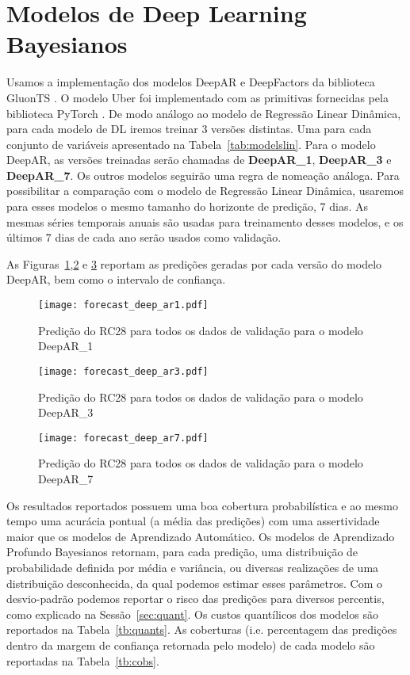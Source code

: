 \section{Modelos de Deep Learning Bayesianos}


Usamos a implementação dos modelos DeepAR e DeepFactors da biblioteca GluonTS
\citep{gluonts}. O modelo Uber foi implementado com as primitivas fornecidas
pela biblioteca PyTorch \citep{pytorch}. De modo análogo ao modelo de Regressão Linear Dinâmica, para
cada modelo de DL iremos treinar 3 versões distintas. Uma para cada conjunto de
variáveis apresentado na Tabela~\ref{tab:modelslin}. Para o modelo DeepAR, as versões treinadas serão chamadas de \textbf{DeepAR\_1},
\textbf{DeepAR\_3} e \textbf{DeepAR\_7}. Os outros modelos seguirão uma
regra de nomeação análoga. Para possibilitar a comparação com o modelo de Regressão Linear Dinâmica, usaremos para esses modelos o mesmo
tamanho do horizonte de predição, 7 dias. As mesmas séries temporais anuais são
usadas para treinamento desses modelos, e os últimos 7 dias de cada ano serão
usados como validação.

As Figuras~\ref{fig:fordeepar1},\ref{fig:fordeepar3} e \ref{fig:fordeepar7} reportam as
predições geradas por cada versão do modelo DeepAR, bem como o intervalo de confiança. 

\begin{figure}[H]
  \centering
  \texttt{[image: forecast\_deep\_ar1.pdf]} 
  \caption{Predição do RC28 para todos os dados de validação para o modelo DeepAR\_1}
  \label{fig:fordeepar1}
\end{figure}

\begin{figure}[H]
  \centering
  \texttt{[image: forecast\_deep\_ar3.pdf]} 
  \caption{Predição do RC28 para todos os dados de validação para o modelo DeepAR\_3}
  \label{fig:fordeepar3}
\end{figure}

\begin{figure}[H]
  \centering
  \texttt{[image: forecast\_deep\_ar7.pdf]} 
  \caption{Predição do RC28 para todos os dados de validação para o modelo DeepAR\_7}
  \label{fig:fordeepar7}
\end{figure}


Os resultados reportados possuem uma boa cobertura probabilística e ao mesmo
tempo uma acurácia pontual (a média das predições) com uma assertividade maior
que os modelos de Aprendizado Automático. Os modelos de Aprendizado Profundo Bayesianos retornam, para cada predição, uma distribuição de
probabilidade definida por média e variância, ou diversas realizações de uma
distribuição desconhecida, da qual podemos estimar esses parâmetros. 
Com o desvio-padrão podemos reportar o risco das predições para diversos percentis, como explicado na
Sessão~\ref{sec:quant}. Os custos quantílicos dos modelos são reportados na
Tabela~\ref{tb:quants}. As coberturas (i.e. percentagem das predições dentro da
margem de confiança retornada pelo modelo) de cada modelo são reportadas na Tabela~\ref{tb:cobs}.



